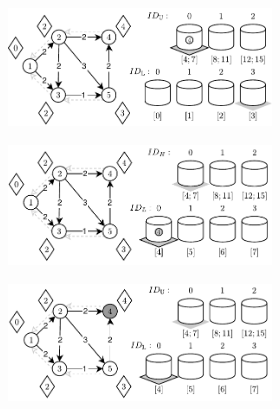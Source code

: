 \begin{figure}[!htbp]
\begin{subfigure}[b]{\textwidth}
\begin{subfigure}[b]{0.495\textwidth}
			\caption{}
			\label{fig:exampleDoubleLevelBuckets:d}
		\end{subfigure}
		\hfill
		\begin{subfigure}[b]{0.495\textwidth}
			\includegraphics[width=\textwidth]{Chapter_II/DOUBLE-LEVEL-BUCKET-Example/e.pdf}
			\caption{}
			\label{fig:exampleDoubleLevelBuckets:e}
		\end{subfigure}
		\hfill\null
	\end{subfigure}
	\begin{subfigure}[b]{\textwidth}
		\null\hfill
		\begin{subfigure}[b]{0.495\textwidth}
			\includegraphics[width=\textwidth]{Chapter_II/DOUBLE-LEVEL-BUCKET-Example/f.pdf}
			\caption{}
			\label{fig:exampleDoubleLevelBuckets:f}
		\end{subfigure}
		\hfill
		\begin{subfigure}[b]{0.495\textwidth}
			\includegraphics[width=\textwidth]{Chapter_II/DOUBLE-LEVEL-BUCKET-Example/g.pdf}

\end{subfigure}
\end{subfigure}
\end{figure}
